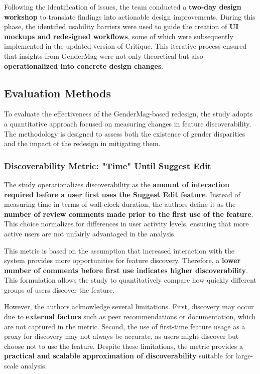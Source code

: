 Following the identification of issues, the team conducted a \textbf{two-day design workshop} to translate findings into actionable design improvements. During this phase, the identified usability barriers were used to guide the creation of \textbf{UI mockups and redesigned workflows}, some of which were subsequently implemented in the updated version of Critique. This iterative process ensured that insights from GenderMag were not only theoretical but also \textbf{operationalized into concrete design changes}.

\subsection{Evaluation Methods}
To evaluate the effectiveness of the GenderMag-based redesign, the study adopts a quantitative approach focused on measuring changes in feature discoverability. The methodology is designed to assess both the existence of gender disparities and the impact of the redesign in mitigating them.

\subsubsection{Discoverability Metric: "Time" Until Suggest Edit}
The study operationalizes discoverability as the \textbf{amount of interaction required before a user first uses the Suggest Edit feature}. Instead of measuring time in terms of wall-clock duration, the authors define it as the \textbf{number of review comments made prior to the first use of the feature}. This choice normalizes for differences in user activity levels, ensuring that more active users are not unfairly advantaged in the analysis.

This metric is based on the assumption that increased interaction with the system provides more opportunities for feature discovery. Therefore, a \textbf{lower number of comments before first use indicates higher discoverability}. This formulation allows the study to quantitatively compare how quickly different groups of users discover the feature.

However, the authors acknowledge several limitations. First, discovery may occur due to \textbf{external factors} such as peer recommendations or documentation, which are not captured in the metric. Second, the use of first-time feature usage as a proxy for discovery may not always be accurate, as users might discover but choose not to use the feature. Despite these limitations, the metric provides a \textbf{practical and scalable approximation of discoverability} suitable for large-scale analysis.

